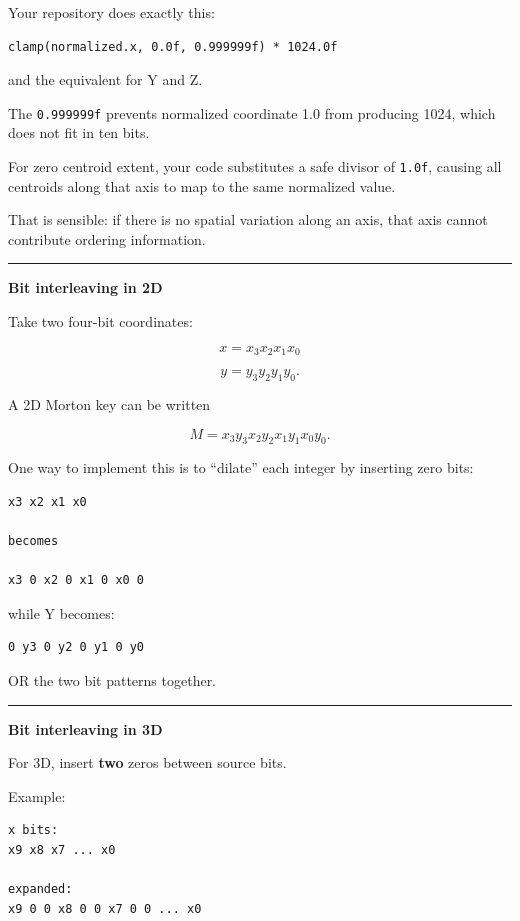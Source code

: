 Your repository does exactly this:

\begin{verbatim}
clamp(normalized.x, 0.0f, 0.999999f) * 1024.0f
\end{verbatim}

and the equivalent for Y and Z.

The \texttt{0.999999f} prevents normalized coordinate 1.0 from producing 1024, which does not fit in ten bits.

For zero centroid extent, your code substitutes a safe divisor of \texttt{1.0f}, causing all centroids along that axis to map to the same normalized value.

That is sensible: if there is no spatial variation along an axis, that axis cannot contribute ordering information.

\begin{center}\rule{0.5\linewidth}{0.5pt}\end{center}

\textbf{Bit interleaving in 2D}

Take two four-bit coordinates:

\[
x=x_3x_2x_1x_0
\]

\[
y=y_3y_2y_1y_0.
\]

A 2D Morton key can be written

\[
M=
x_3y_3x_2y_2x_1y_1x_0y_0.
\]

One way to implement this is to ``dilate'' each integer by inserting zero bits:

\begin{verbatim}
x3 x2 x1 x0

becomes

x3 0 x2 0 x1 0 x0 0
\end{verbatim}

while Y becomes:

\begin{verbatim}
0 y3 0 y2 0 y1 0 y0
\end{verbatim}

OR the two bit patterns together.

\begin{center}\rule{0.5\linewidth}{0.5pt}\end{center}

\textbf{Bit interleaving in 3D}

For 3D, insert \textbf{two} zeros between source bits.

Example:

\begin{verbatim}
x bits:
x9 x8 x7 ... x0

expanded:
x9 0 0 x8 0 0 x7 0 0 ... x0
\end{verbatim}

